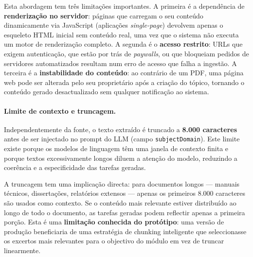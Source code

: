 Esta abordagem tem tr\^es limita\c{c}\~oes importantes. A primeira \'e a
depend\^encia de \textbf{renderiza\c{c}\~ao no servidor}: p\'aginas que
carregam o seu conte\'udo dinamicamente via JavaScript (aplica\c{c}\~oes
\emph{single-page}) devolvem apenas o esqueleto HTML inicial sem conte\'udo
real, uma vez que o sistema n\~ao executa um motor de renderiza\c{c}\~ao
completo. A segunda \'e o \textbf{acesso restrito}: URLs que exigem
autentica\c{c}\~ao, que est\~ao por tr\'as de \emph{paywalls}, ou que
bloqueiam pedidos de servidores automatizados resultam num erro de acesso
que falha a ingest\~ao. A terceira \'e a \textbf{instabilidade do conte\'udo}:
ao contr\'ario de um PDF, uma p\'agina web pode ser alterada pelo seu
propriet\'ario ap\'os a cria\c{c}\~ao do t\'opico, tornando o conte\'udo
gerado desactualizado sem qualquer notifica\c{c}\~ao ao sistema.

\paragraph{Limite de contexto e truncagem.}
Independentemente da fonte, o texto extra\'ido \'e truncado a
\textbf{8.000 caracteres} antes de ser injectado no prompt do LLM
(campo \texttt{subjectDomain}). Este limite existe porque os modelos de
linguagem t\^em uma janela de contexto finita e porque textos
excessivamente longos diluem a aten\c{c}\~ao do modelo, reduzindo a
coer\^encia e a especificidade das tarefas geradas.

A truncagem tem uma implica\c{c}\~ao directa: para documentos longos ---
manuais t\'ecnicos, disserta\c{c}\~oes, relat\'orios extensos --- apenas
os primeiros 8.000 caracteres s\~ao usados como contexto. Se o conte\'udo
mais relevante estiver distribu\'ido ao longo de todo o documento, as
tarefas geradas podem reflectir apenas a primeira por\c{c}\~ao. Esta \'e
uma \textbf{limita\c{c}\~ao conhecida do prot\'otipo}: uma vers\~ao de
produ\c{c}\~ao beneficiaria de uma estratégia de chunking inteligente que
seleccionasse os excertos mais relevantes para o objectivo do m\'odulo
em vez de truncar linearmente.


